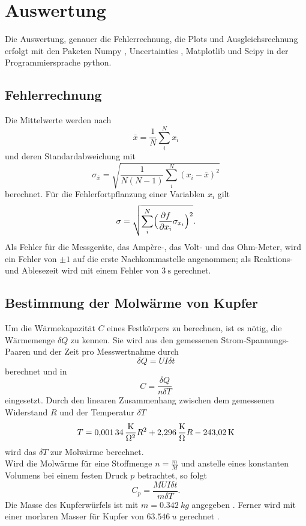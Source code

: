 \section{Auswertung}
Die Auswertung, genauer die Fehlerrechnung, die Plots und Ausgleichsrechnung erfolgt mit den Paketen
Numpy \cite{numpy}, Uncertainties \cite{uncertainties}, Matplotlib \cite{matplotlib} und Scipy \cite{scipy} in der Programmiersprache python.
\subsection{Fehlerrechnung}
Die Mittelwerte werden nach
\begin{equation}
	\bar{x}=\frac{1}{N}\sum_{i}^N x_i
\end{equation}
und deren Standardabweichung mit
\begin{equation}
	\sigma_{\bar{x}} = \sqrt{\frac{1}{N(N-1)} \sum_{i}^N (x_i-\bar{x})^2}
\end{equation}
berechnet.
Für die Fehlerfortpflanzung einer Variablen $x_i$ gilt
\begin{equation}
	\sigma = \sqrt{\sum_{i}^N \Bigl(\frac{\partial f}{\partial x_i} \sigma_{x_i}\Bigr)^2}.
	\label{eq:gaussfehler}
\end{equation}
Als Fehler für die Messgeräte, das Amp\`{e}re-, das Volt- und das Ohm-Meter, wird ein Fehler von $\pm 1$ auf die erste Nachkommastelle angenommen;
als Reaktions- und Ablesezeit wird mit einem Fehler von $\SI{3}{\second}$ gerechnet.

\subsection{Bestimmung der Molwärme von Kupfer}
Um die Wärmekapazität $C$ eines Festkörpers zu berechnen, ist es nötig, die Wärmemenge $\delta Q$ zu kennen.
Sie wird aus den gemessenen Strom-Spannungs-Paaren und der Zeit pro Messwertnahme durch
\begin{equation}
  \delta Q = U I \delta t
\end{equation}
berechnet und in
\begin{equation}
  C=\frac{\delta Q}{n\delta T}
\end{equation}
eingesetzt.
Durch den linearen Zusammenhang zwischen dem gemessenen Widerstand $R$ und der Temperatur $\delta T$
\begin{equation}
  T=\SI{0,00134}{\frac{K}{\ohm^2}} R^2 + \SI{2,296}{\frac{K}{\ohm}} R - \SI{243,02}{K}
\end{equation}
wird das $\delta T$ zur Molwärme berechnet.\\
Wird die Molwärme für eine Stoffmenge $n= \frac{m}{M}$ und anstelle eines konstanten Volumens bei einem festen Druck $p$ betrachtet,
so folgt
\begin{equation}
  C_p=\frac{MUI\delta t}{m\delta T}.
\end{equation}
Die Masse des Kupferwürfels ist mit $m=\SI{0,342}{kg}$ angegeben \cite{anleitung}.
Ferner wird mit einer morlaren Masser für Kupfer von $\SI{63,546}{u}$ gerechnet \cite{molaremassecu}.\\

